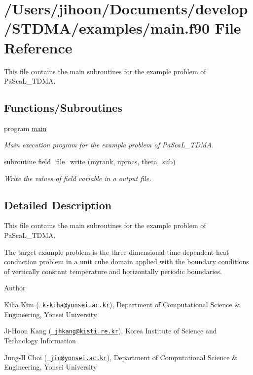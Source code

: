 \hypertarget{main_8f90}{}\section{/\+Users/jihoon/\+Documents/develop/\+S\+T\+D\+M\+A/examples/main.f90 File Reference}
\label{main_8f90}


This file contains the main subroutines for the example problem of Pa\+Sca\+L\+\_\+\+T\+D\+MA.  


\subsection*{Functions/\+Subroutines}
\begin{DoxyCompactItemize}
\item 
program \mbox{\hyperlink{main_8f90_a8ec2266d83cd6c0b762cbcbc92c0af3d}{main}}
\begin{DoxyCompactList}\small\item\em Main execution program for the example problem of Pa\+Sca\+L\+\_\+\+T\+D\+MA. \end{DoxyCompactList}\item 
subroutine \mbox{\hyperlink{main_8f90_af0a1310807f21ee1a2c0fdf14c58b63b}{field\+\_\+file\+\_\+write}} (myrank, nprocs, theta\+\_\+sub)
\begin{DoxyCompactList}\small\item\em Write the values of field variable in a output file. \end{DoxyCompactList}\end{DoxyCompactItemize}


\subsection{Detailed Description}
This file contains the main subroutines for the example problem of Pa\+Sca\+L\+\_\+\+T\+D\+MA. 

The target example problem is the three-\/dimensional time-\/dependent heat conduction problem in a unit cube domain applied with the boundary conditions of vertically constant temperature and horizontally periodic boundaries. \begin{DoxyAuthor}{Author}

\end{DoxyAuthor}

\begin{DoxyItemize}
\item Kiha Kim (\href{mailto:k-kiha@yonsei.ac.kr}{\texttt{ k-\/kiha@yonsei.\+ac.\+kr}}), Department of Computational Science \& Engineering, Yonsei University
\item Ji-\/\+Hoon Kang (\href{mailto:jhkang@kisti.re.kr}{\texttt{ jhkang@kisti.\+re.\+kr}}), Korea Institute of Science and Technology Information
\item Jung-\/\+Il Choi (\href{mailto:jic@yonsei.ac.kr}{\texttt{ jic@yonsei.\+ac.\+kr}}), Department of Computational Science \& Engineering, Yonsei University
\end{DoxyItemize}

